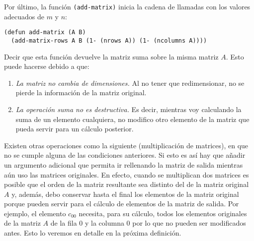 \documentclass[a4paper,10pt]{article}
\begin{document}
\par \vspace{10pt}	

Por último, la función \texttt{(add-matrix)} inicia la cadena de llamadas con los valores adecuados de $m$ y $n$:

\par \vspace{10pt}	

\begin{lstlisting}[language=clips]
(defun add-matrix (A B)
  (add-matrix-rows A B (1- (nrows A)) (1- (ncolumns A))))
\end{lstlisting}

\par \vspace{10pt}	

Decir que esta función devuelve la matriz suma sobre la misma matriz $A$. Esto puede hacerse debido a que:

\par \vspace{10pt}	

\begin{enumerate}
	\item \emph{La matriz no cambia de dimensiones.} Al no tener que redimensionar, no se pierde la información de la matriz original.
	\item \emph{La operación suma no es destructiva.} Es decir, mientras voy calculando la suma de un elemento cualquiera, no modifico otro elemento de la matriz que pueda servir para un cálculo posterior.
\end{enumerate}

\par \vspace{10pt}	

Existen otras operaciones como la siguiente (multiplicación de matrices), en que no se cumple alguna de las condiciones anteriores. Si esto es así hay que añadir un argumento adicional que permita ir rellenando la matriz de salida mientras aún uso las matrices originales. En efecto, cuando se multiplican dos matrices es posible que el orden de la matriz resultante sea distinto del de la matriz original $A$ y, además, debo conservar hasta el final los elementos de la matriz original porque pueden servir para el cálculo de elementos de la matriz de salida. Por ejemplo, el elemento $c_{00}$ necesita, para su cálculo, todos los elementos originales de la matriz $A$ de la fila 0 y la columna 0 por lo que no pueden ser modificados antes. Esto lo veremos en detalle en la próxima definición.
\end{document}
